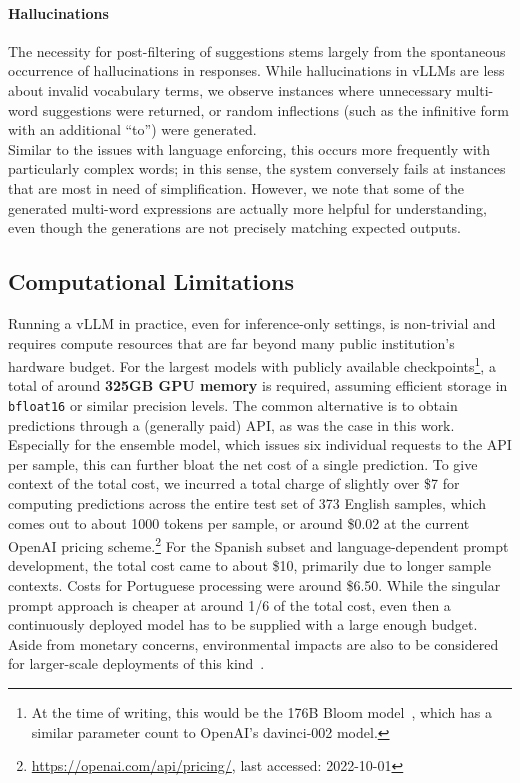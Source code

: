 \documentclass[11pt]{article}
\newcommand{\todo}[1]{\textcolor{red}{TODO: #1}}
\begin{document}
\paragraph{Hallucinations}
The necessity for post-filtering of suggestions stems largely from the spontaneous occurrence of hallucinations in responses. While hallucinations in vLLMs are less about invalid vocabulary terms, we observe instances where unnecessary multi-word suggestions were returned, or random inflections (such as the infinitive form with an additional ``to'') were generated.\\
Similar to the issues with language enforcing, this occurs more frequently with particularly complex words; in this sense, the system conversely fails at instances that are most in need of simplification.
However, we note that some of the generated multi-word expressions are actually more helpful for understanding, even though the generations are not precisely matching expected outputs.





\subsection{Computational Limitations}
\label{sec:budget}
Running a vLLM in practice, even for inference-only settings, is non-trivial and requires compute resources that are far beyond many public institution's hardware budget. For the largest models with publicly available checkpoints\footnote{At the time of writing, this would be the 176B Bloom model~\cite{bigscience-2022-bloom}, which has a similar parameter count to OpenAI's davinci-002 model.}, a total of around \textbf{325GB GPU memory} is required, assuming efficient storage in \texttt{bfloat16} or similar precision levels.
The common alternative is to obtain predictions through a (generally paid) API, as was the case in this work. Especially for the ensemble model, which issues six individual requests to the API per sample, this can further bloat the net cost of a single prediction.
To give context of the total cost, we incurred a total charge of slightly over \$7 for computing predictions across the entire test set of 373 English samples, which comes out to about 1000 tokens per sample, or around \$0.02 at the current OpenAI pricing scheme.\footnote{\url{https://openai.com/api/pricing/}, last accessed: 2022-10-01}
For the Spanish subset and language-dependent prompt development, the total cost came to about \$10, primarily due to longer sample contexts. Costs for Portuguese processing were around \$6.50.
While the singular prompt approach is cheaper at around 1/6 of the total cost, even then a continuously deployed model has to be supplied with a large enough budget.
Aside from monetary concerns, environmental impacts are also to be considered for larger-scale deployments of this kind~\cite{lacoste-etal-2019-quantifying}.
\end{document}
